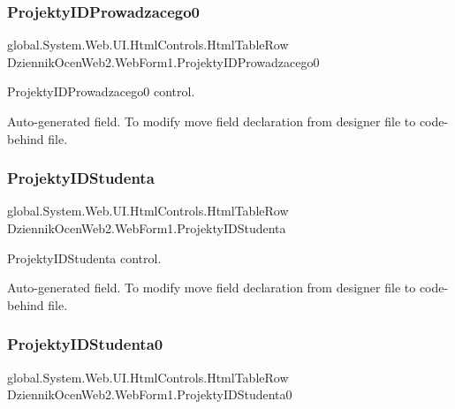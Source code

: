 \subsubsection{\texorpdfstring{Projekty\+I\+D\+Prowadzacego0}{ProjektyIDProwadzacego0}}
{\footnotesize\ttfamily global.\+System.\+Web.\+U\+I.\+Html\+Controls.\+Html\+Table\+Row Dziennik\+Ocen\+Web2.\+Web\+Form1.\+Projekty\+I\+D\+Prowadzacego0\hspace{0.3cm}{\ttfamily [protected]}}



Projekty\+I\+D\+Prowadzacego0 control. 

Auto-\/generated field. To modify move field declaration from designer file to code-\/behind file. \mbox{\label{class_dziennik_ocen_web2_1_1_web_form1_a32a9ef95539a282ca16273742f9e5b7e}} 
\subsubsection{\texorpdfstring{Projekty\+I\+D\+Studenta}{ProjektyIDStudenta}}
{\footnotesize\ttfamily global.\+System.\+Web.\+U\+I.\+Html\+Controls.\+Html\+Table\+Row Dziennik\+Ocen\+Web2.\+Web\+Form1.\+Projekty\+I\+D\+Studenta\hspace{0.3cm}{\ttfamily [protected]}}



Projekty\+I\+D\+Studenta control. 

Auto-\/generated field. To modify move field declaration from designer file to code-\/behind file. \mbox{\label{class_dziennik_ocen_web2_1_1_web_form1_a1a4e38055cff20b9c979b9a72608f5d7}} 
\subsubsection{\texorpdfstring{Projekty\+I\+D\+Studenta0}{ProjektyIDStudenta0}}
{\footnotesize\ttfamily global.\+System.\+Web.\+U\+I.\+Html\+Controls.\+Html\+Table\+Row Dziennik\+Ocen\+Web2.\+Web\+Form1.\+Projekty\+I\+D\+Studenta0\hspace{0.3cm}{\ttfamily [protected]}}



